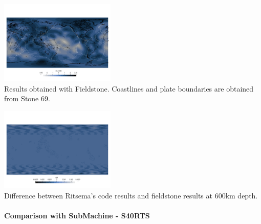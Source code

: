 \begin{center}
\includegraphics[width=5.5cm]{python_codes/fieldstone_85/images/fieldstone/fieldstone_S20RTS_2891km.png}\\
{\captionfont Results obtained with Fieldstone. Coastlines and plate boundaries are obtained from Stone 69.}
\end{center}


\begin{center}
\includegraphics[width=5.5cm]{python_codes/fieldstone_85/images/fieldstone/diff_600km_S20RTS.png}\\
{\captionfont Difference between Ritsema's code results and fieldstone results at 600\si{km} depth.}
\end{center}


\newpage
\paragraph{Comparison with SubMachine - S40RTS}

